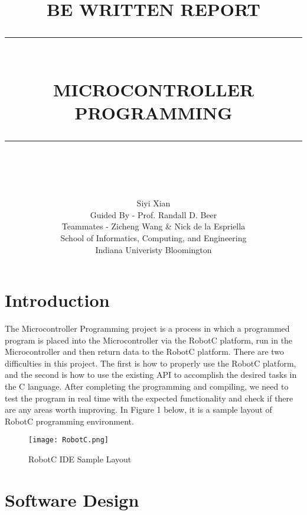 \documentclass[12pt]{report}
\newcommand{\HRule}[1]{\rule{\linewidth}{#1}}
\begin{document}
\title{ \normalsize \textsc{BE WRITTEN REPORT}
		\\ [2.0cm]
		\HRule{0.5pt} \\
		\LARGE \textbf{\uppercase{Microcontroller Programming}}
		\HRule{2pt} \\ [0.5cm]
		\normalsize  \vspace*{5\baselineskip}}

\date{}

\author{
		\Large Siyi Xian \\
		Guided By - Prof. Randall D. Beer  \\
        Teammates - Zicheng Wang \& Nick de la Espriella\\
School of Informatics, Computing, and Engineering\\
Indiana Univeristy Bloomington\\ }

\maketitle
\newpage

\tableofcontents
\newpage

\section{Introduction}

The Microcontroller Programming project is a process in which a programmed program is placed into the Microcontroller via the RobotC platform, run in the Microcontroller and then return data to the RobotC platform. There are two difficulties in this project. The first is how to properly use the RobotC platform, and the second is how to use the existing API to accomplish the desired tasks in the C language. After completing the programming and compiling, we need to test the program in real time with the expected functionality and check if there are any areas worth improving. In Figure 1 below, it is a sample layout of RobotC programming environment.

\begin{figure}[htbp]
	\centering
	\texttt{[image: RobotC.png]}
	\caption{RobotC IDE Sample Layout}
\end{figure}

\section{Software Design}
\end{document}
